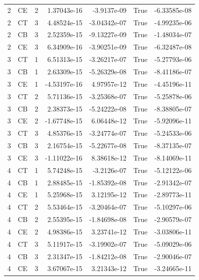 \begin{tabular}{rlrrrrr}
2 & CE & 2 & 1.37043e-16 & -3.9137e-09 & True & -6.33585e-08 \\
2 & CT & 3 & 4.48524e-15 & -3.04342e-07 & True & -4.99235e-06 \\
2 & CB & 3 & 2.52359e-15 & -9.13227e-09 & True & -1.48034e-07 \\
2 & CE & 3 & 6.34909e-16 & -3.90251e-09 & True & -6.32487e-08 \\
3 & CT & 1 & 6.51313e-15 & -3.26217e-07 & True & -5.27793e-06 \\
3 & CB & 1 & 2.63309e-15 & -5.26329e-08 & True & -8.41186e-07 \\
3 & CE & 1 & -4.53197e-16 & 4.97957e-12 & True & -4.45196e-11 \\
3 & CT & 2 & 5.71136e-15 & -3.25368e-07 & True & -5.25878e-06 \\
3 & CB & 2 & 2.38373e-15 & -5.24222e-08 & True & -8.38805e-07 \\
3 & CE & 2 & -1.67748e-15 & 6.06448e-12 & True & -5.92096e-11 \\
3 & CT & 3 & 4.85376e-15 & -3.24774e-07 & True & -5.24533e-06 \\
3 & CB & 3 & 2.16754e-15 & -5.22677e-08 & True & -8.37135e-07 \\
3 & CE & 3 & -1.11022e-16 & 8.38618e-12 & True & -8.14069e-11 \\
4 & CT & 1 & 5.74248e-15 & -3.2126e-07 & True & -5.12122e-06 \\
4 & CB & 1 & 2.88485e-15 & -1.85392e-08 & True & -2.91342e-07 \\
4 & CE & 1 & 5.25968e-15 & 3.12195e-12 & True & -2.89773e-11 \\
4 & CT & 2 & 5.53464e-15 & -3.20464e-07 & True & -5.10297e-06 \\
4 & CB & 2 & 2.55395e-15 & -1.84698e-08 & True & -2.90579e-07 \\
4 & CE & 2 & 4.98386e-15 & 3.23741e-12 & True & -3.03806e-11 \\
4 & CT & 3 & 5.11917e-15 & -3.19902e-07 & True & -5.09029e-06 \\
4 & CB & 3 & 2.31347e-15 & -1.84212e-08 & True & -2.90046e-07 \\
4 & CE & 3 & 3.67067e-15 & 3.21343e-12 & True & -3.24665e-11 \\
\bottomrule
\end{tabular}
